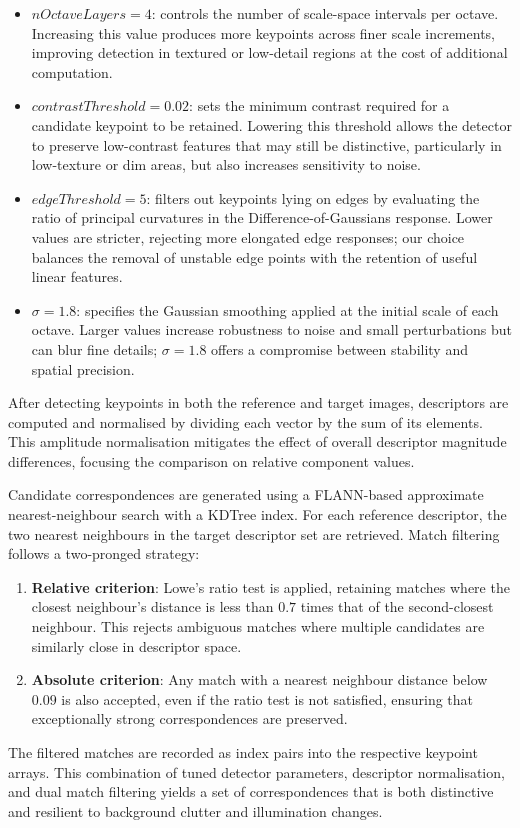 \begin{itemize}
    \item \textbf{$nOctaveLayers = 4$}: controls the number of scale-space intervals per octave. Increasing this value produces more keypoints across finer scale increments, improving detection in textured or low-detail regions at the cost of additional computation.
    \item \textbf{$contrastThreshold = 0.02$}: sets the minimum contrast required for a candidate keypoint to be retained. Lowering this threshold allows the detector to preserve low-contrast features that may still be distinctive, particularly in low-texture or dim areas, but also increases sensitivity to noise.
    \item \textbf{$edgeThreshold = 5$}: filters out keypoints lying on edges by evaluating the ratio of principal curvatures in the Difference-of-Gaussians response. Lower values are stricter, rejecting more elongated edge responses; our choice balances the removal of unstable edge points with the retention of useful linear features.
    \item \textbf{$\sigma = 1.8$}: specifies the Gaussian smoothing applied at the initial scale of each octave. Larger values increase robustness to noise and small perturbations but can blur fine details; $\sigma = 1.8$ offers a compromise between stability and spatial precision.
\end{itemize}

After detecting keypoints in both the reference and target images, descriptors are computed and normalised by dividing each vector by the sum of its elements. This amplitude normalisation mitigates the effect of overall descriptor magnitude differences, focusing the comparison on relative component values.

Candidate correspondences are generated using a FLANN-based approximate nearest-neighbour search with a KDTree index. For each reference descriptor, the two nearest neighbours in the target descriptor set are retrieved. Match filtering follows a two-pronged strategy:
\begin{enumerate}
    \item \textbf{Relative criterion}: Lowe’s ratio test is applied, retaining matches where the closest neighbour’s distance is less than $0.7$ times that of the second-closest neighbour. This rejects ambiguous matches where multiple candidates are similarly close in descriptor space.
    \item \textbf{Absolute criterion}: Any match with a nearest neighbour distance below $0.09$ is also accepted, even if the ratio test is not satisfied, ensuring that exceptionally strong correspondences are preserved.
\end{enumerate}

The filtered matches are recorded as index pairs into the respective keypoint arrays. This combination of tuned detector parameters, descriptor normalisation, and dual match filtering yields a set of correspondences that is both distinctive and resilient to background clutter and illumination changes.
